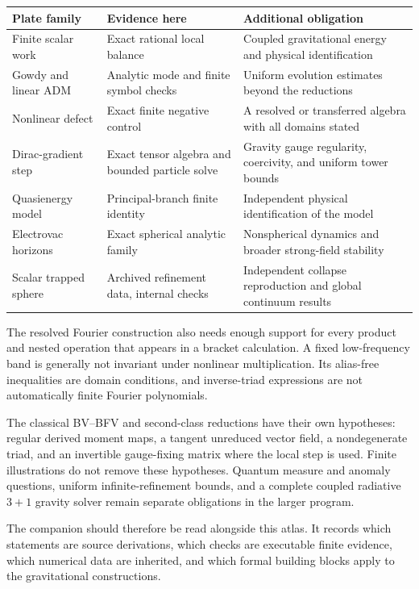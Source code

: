\begin{center}
\begin{tabularx}{\linewidth}{@{}L{.26\linewidth}>{\raggedright\arraybackslash}X>{\raggedright\arraybackslash}X@{}}
\toprule
Plate family & Evidence here & Additional obligation\\
\midrule
Finite scalar work & Exact rational local balance & Coupled gravitational energy and physical identification\\
Gowdy and linear ADM & Analytic mode and finite symbol checks & Uniform evolution estimates beyond the reductions\\
Nonlinear defect & Exact finite negative control & A resolved or transferred algebra with all domains stated\\
Dirac-gradient step & Exact tensor algebra and bounded particle solve & Gravity gauge regularity, coercivity, and uniform tower bounds\\
Quasienergy model & Principal-branch finite identity & Independent physical identification of the model\\
Electrovac horizons & Exact spherical analytic family & Nonspherical dynamics and broader strong-field stability\\
Scalar trapped sphere & Archived refinement data, internal checks & Independent collapse reproduction and global continuum results\\
\bottomrule
\end{tabularx}
\end{center}

The resolved Fourier construction also needs enough support for every product and nested operation that appears in a bracket calculation. A fixed low-frequency band is generally not invariant under nonlinear multiplication. Its alias-free inequalities are domain conditions, and inverse-triad expressions are not automatically finite Fourier polynomials.

The classical BV--BFV and second-class reductions have their own hypotheses: regular derived moment maps, a tangent unreduced vector field, a nondegenerate triad, and an invertible gauge-fixing matrix where the local step is used. Finite illustrations do not remove these hypotheses. Quantum measure and anomaly questions, uniform infinite-refinement bounds, and a complete coupled radiative $3+1$ gravity solver remain separate obligations in the larger program.

The companion should therefore be read alongside this atlas. It records which statements are source derivations, which checks are executable finite evidence, which numerical data are inherited, and which formal building blocks apply to the gravitational constructions.
\endgroup
